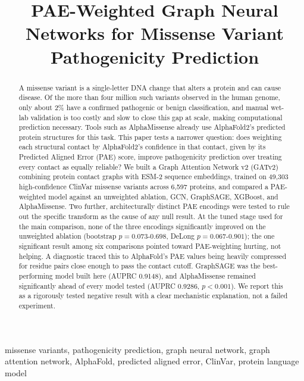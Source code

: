 \documentclass[10pt,conference,a4paper]{IEEEtran}
\begin{document}
\pagestyle{plain}

\title{PAE-Weighted Graph Neural Networks for Missense Variant Pathogenicity Prediction}

\author{
\and
{}
}

\maketitle
\thispagestyle{plain}

\begin{abstract}
A missense variant is a single-letter DNA change that alters a protein and can cause disease. Of the more than four million such variants observed in the human genome, only about 2\% have a confirmed pathogenic or benign classification, and manual wet-lab validation is too costly and slow to close this gap at scale, making computational prediction necessary. Tools such as AlphaMissense already use AlphaFold2's predicted protein structures for this task. This paper tests a narrower question: does weighting each structural contact by AlphaFold2's confidence in that contact, given by its Predicted Aligned Error (PAE) score, improve pathogenicity prediction over treating every contact as equally reliable? We built a Graph Attention Network v2 (GATv2) combining protein contact graphs with ESM-2 sequence embeddings, trained on 49,303 high-confidence ClinVar missense variants across 6,597 proteins, and compared a PAE-weighted model against an unweighted ablation, GCN, GraphSAGE, XGBoost, and AlphaMissense. Two further, architecturally distinct PAE encodings were tested to rule out the specific transform as the cause of any null result. At the tuned stage used for the main comparison, none of the three encodings significantly improved on the unweighted ablation (bootstrap $p=0.073$-$0.698$, DeLong $p=0.067$-$0.901$); the one significant result among six comparisons pointed toward PAE-weighting hurting, not helping. A diagnostic traced this to AlphaFold's PAE values being heavily compressed for residue pairs close enough to pass the contact cutoff. GraphSAGE was the best-performing model built here (AUPRC 0.9148), and AlphaMissense remained significantly ahead of every model tested (AUPRC 0.9286, $p<0.001$). We report this as a rigorously tested negative result with a clear mechanistic explanation, not a failed experiment.
\end{abstract}
\begin{IEEEkeywords}
missense variants, pathogenicity prediction, graph neural network, graph attention network, AlphaFold, predicted aligned error, ClinVar, protein language model
\end{IEEEkeywords}
\end{document}
